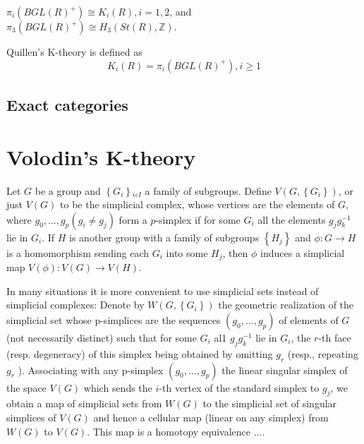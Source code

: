 \begin{coro}
$\pi_i\left(B G L(R)^{+}\right) \cong K_i(R), i=1,2$, and
$
\pi_3\left(B G L(R)^{+}\right) \cong H_3(S t(R), \mathbb{Z}) .
$
\end{coro}
Quillen's K-theory is defined as
$$K_i(R)=\pi_i\left(B G L(R)^{+}\right), i \geq 1$$

\section{Exact categories}



\chapter{Volodin's K-theory}

Let $G$ be a group and $\left\{G_i\right\}{ }_{i \varepsilon I}$ a family of subgroups. Define $V\left(G,\left\{G_i\right\}\right)$, or just $V(G)$ to be the simplicial complex, whose vertices are the elements of $G$, where $g_0, \ldots, g_p\left(g_i \neq g_j\right)$ form a $p$-simplex if for some $G_i$ all the elements $g_j g_k^{-1}$ lie in $G_i$. If $H$ is another group with a family of subgroups $\left\{H_j\right\}$ and $\phi: G \rightarrow H$ is a homomorphism sending each $G_i$ into some $H_j$, then $\phi$ induces a simplicial map $V(\phi): V(G) \rightarrow V(H)$.

In many situations it is more convenient to use simplicial sets instead of simplicial complexes: Denote by $W\left(G,\left\{G_i\right\}\right)$ the geometric realization of the simplicial set whose p-simplices are the sequences $\left(g_0, \ldots, g_p\right)$ of elements of $G$ (not necessarily distinct) such that for some $G_i$ al1 $g_j g_k^{-1}$ lie in $G_i$, the $r$-th face (resp. degeneracy) of this simplex being obtained by omitting $g_r$ (resp., repeating $g_r$ ). Associating with any p-simplex $\left(g_0, \ldots, g_p\right)$ the linear singular simplex of the space $V(G)$ which sends the $i$-th vertex of the standard simplex to $g_j$, we obtain a map of simplicial sets from $W(G)$ to the simplicial set of singular simplices of $V(G)$ and hence a cellular map (linear on any simplex) from $W(G)$ to $V(G)$. This map is a homotopy equivalence .... %

